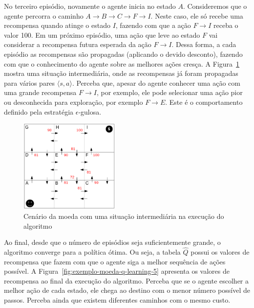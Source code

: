 No terceiro episódio, novamente o agente inicia no estado $A$. Consideremos que o agente percorra o caminho $A \rightarrow B \rightarrow C \rightarrow F \rightarrow I$. Neste caso, ele só recebe uma recompensa quando atinge o estado $I$, fazendo com que a ação $F \rightarrow I$ receba o valor 100. Em um próximo episódio, uma ação que leve ao estado $F$ vai considerar a recompensa futura esperada da ação $F \rightarrow I$. Dessa forma, a cada episódio as recompensas são propagadas (aplicando o devido desconto), fazendo com que o conhecimento do agente sobre as melhores ações cresça. A Figura~\ref{fig:exemplo-moeda-q-learning-4} mostra uma situação intermediária, onde as recompensas já foram propagadas para vários pares $\langle s, a \rangle$. Perceba que, apesar do agente conhecer uma ação com uma grande recompensa $F \rightarrow I$, por exemplo, ele pode selecionar uma ação pior ou desconhecida para exploração, por exemplo $F \rightarrow E$. Este é o comportamento definido pela estratégia $\epsilon$-gulosa.

\begin{figure}[h]
	\centering
	\includegraphics[width=0.44\textwidth]{img/exemplo-moeda-q-learning-4}
	\caption{Cenário da moeda com uma situação intermediária na execução do algoritmo}
	\label{fig:exemplo-moeda-q-learning-4}
\end{figure}

Ao final, desde que o número de episódios seja suficientemente grande, o algoritmo converge para a política ótima. Ou seja, a tabela $\widehat{Q}$ possui os valores de recompensa que fazem com que o agente siga a melhor sequência de ações possível. A Figura~\ref{fig:exemplo-moeda-q-learning-5} apresenta os valores de recompensa ao final da execução do algoritmo. Perceba que se o agente escolher a melhor ação de cada estado, ele chega ao destino com o menor número possível de passos. Perceba ainda que existem diferentes caminhos com o mesmo custo.

